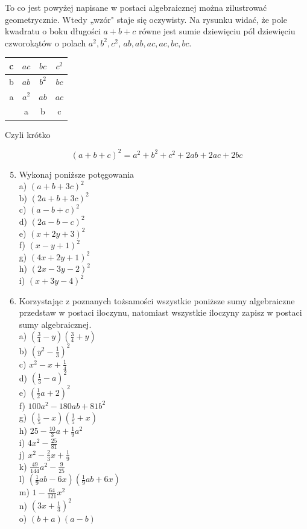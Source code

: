 \documentclass[10pt]{article}
\begin{document}
To co jest powyżej napisane w postaci algebraicznej można zilustrować geometrycznie. Wtedy „wzór" staje się oczywisty. Na rysunku widać, że pole kwadratu o boku długości \(a+b+c\) równe jest sumie dziewięciu pól dziewięciu czworokątów o polach \(a^{2}, b^{2}, c^{2}\), \(a b, a b, a c, a c, b c, b c\).

\begin{center}
\begin{tabular}{|c|c|c|c|}
\hline
c & \(a c\) & \(b c\) & \(c^{2}\) \\
\hline
b & \(a b\) & \(b^{2}\) & \(b c\) \\
\hline
a & \(a^{2}\) & \(a b\) & \(a c\) \\
\hline
 & a & b & c \\
\hline
\end{tabular}
\end{center}

Czyli krótko

\[
(a+b+c)^{2}=a^{2}+b^{2}+c^{2}+2 a b+2 a c+2 b c
\]

\begin{enumerate}
  \setcounter{enumi}{4}
  \item Wykonaj poniższe potęgowania\\
a) \((a+b+3 c)^{2}\)\\
b) \((2 a+b+3 c)^{2}\)\\
c) \((a-b+c)^{2}\)\\
d) \((2 a-b-c)^{2}\)\\
e) \((x+2 y+3)^{2}\)\\
f) \((x-y+1)^{2}\)\\
g) \((4 x+2 y+1)^{2}\)\\
h) \((2 x-3 y-2)^{2}\)\\
i) \((x+3 y-4)^{2}\)
  \item Korzystając z poznanych tożsamości wszystkie poniższe sumy algebraiczne przedstaw w postaci iloczynu, natomiast wszystkie iloczyny zapisz w postaci sumy algebraicznej.\\
a) \(\left(\frac{3}{4}-y\right)\left(\frac{3}{4}+y\right)\)\\
b) \(\left(y^{2}-\frac{1}{3}\right)^{2}\)\\
c) \(x^{2}-x+\frac{1}{4}\)\\
d) \(\left(\frac{1}{3}-a\right)^{2}\)\\
e) \(\left(\frac{1}{2} a+2\right)^{2}\)\\
f) \(100 a^{2}-180 a b+81 b^{2}\)\\
g) \(\left(\frac{1}{5}-x\right)\left(\frac{1}{5}+x\right)\)\\
h) \(25-\frac{10}{3} a+\frac{1}{9} a^{2}\)\\
i) \(4 x^{2}-\frac{25}{81}\)\\
j) \(x^{2}-\frac{2}{3} x+\frac{1}{9}\)\\
k) \(\frac{49}{144} a^{2}-\frac{9}{25}\)\\
l) \(\left(\frac{1}{9} a b-6 x\right)\left(\frac{1}{9} a b+6 x\right)\)\\
m) \(1-\frac{64}{121} x^{2}\)\\
n) \(\left(3 x+\frac{1}{3}\right)^{2}\)\\
o) \((b+a)(a-b)\)
\end{enumerate}
\end{document}
